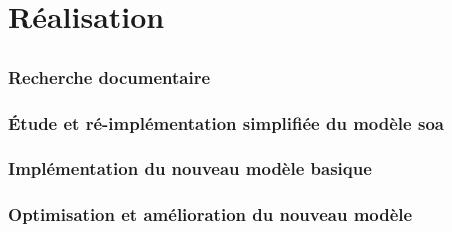 \chapter{Réalisation}



\section{} %
\subsection{Recherche documentaire} %
\subsection{Étude et ré-implémentation simplifiée du modèle \gls{soa}} %
\subsection{Implémentation du nouveau modèle basique} %
\subsection{Optimisation et amélioration du nouveau modèle}
